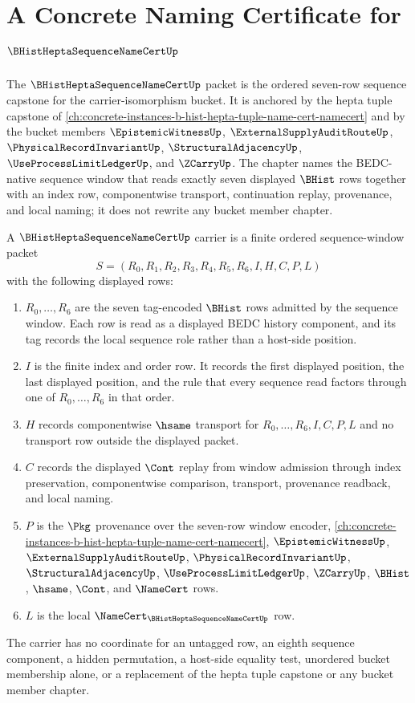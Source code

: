 \chapter{A Concrete Naming Certificate for $\BHistHeptaSequenceNameCertUp$}
\label{ch:concrete-instances-b-hist-hepta-sequence-name-cert-namecert}

The $\BHistHeptaSequenceNameCertUp$ packet is the ordered seven-row sequence capstone for the carrier-isomorphism bucket. It is anchored by the hepta tuple capstone of \autoref{ch:concrete-instances-b-hist-hepta-tuple-name-cert-namecert} and by the bucket members $\EpistemicWitnessUp$, $\ExternalSupplyAuditRouteUp$, $\PhysicalRecordInvariantUp$, $\StructuralAdjacencyUp$, $\UseProcessLimitLedgerUp$, and $\ZCarryUp$. The chapter names the BEDC-native sequence window that reads exactly seven displayed $\BHist$ rows together with an index row, componentwise transport, continuation replay, provenance, and local naming; it does not rewrite any bucket member chapter.

\begin{definition}
\label{def:b-hist-hepta-sequence-name-cert-carrier}
A $\BHistHeptaSequenceNameCertUp$ carrier is a finite ordered sequence-window packet
$$
S=(R_0,R_1,R_2,R_3,R_4,R_5,R_6,I,H,C,P,L)
$$
with the following displayed rows:
\begin{enumerate}
\item $R_0,\ldots,R_6$ are the seven tag-encoded $\BHist$ rows admitted by the sequence window. Each row is read as a displayed BEDC history component, and its tag records the local sequence role rather than a host-side position.
\item $I$ is the finite index and order row. It records the first displayed position, the last displayed position, and the rule that every sequence read factors through one of $R_0,\ldots,R_6$ in that order.
\item $H$ records componentwise $\hsame$ transport for $R_0,\ldots,R_6,I,C,P,L$ and no transport row outside the displayed packet.
\item $C$ records the displayed $\Cont$ replay from window admission through index preservation, componentwise comparison, transport, provenance readback, and local naming.
\item $P$ is the $\Pkg$ provenance over the seven-row window encoder, \autoref{ch:concrete-instances-b-hist-hepta-tuple-name-cert-namecert}, $\EpistemicWitnessUp$, $\ExternalSupplyAuditRouteUp$, $\PhysicalRecordInvariantUp$, $\StructuralAdjacencyUp$, $\UseProcessLimitLedgerUp$, $\ZCarryUp$, $\BHist$, $\hsame$, $\Cont$, and $\NameCert$ rows.
\item $L$ is the local $\NameCert_{\BHistHeptaSequenceNameCertUp}$ row.
\end{enumerate}
The carrier has no coordinate for an untagged row, an eighth sequence component, a hidden permutation, a host-side equality test, unordered bucket membership alone, or a replacement of the hepta tuple capstone or any bucket member chapter.
\end{definition}

